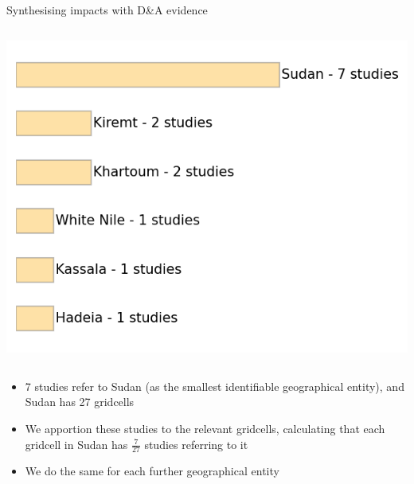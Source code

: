 \documentclass[9pt]{beamer}
\begin{document}
\begin{frame}{Synthesising impacts with D\&A evidence}
\begin{columns}
\begin{column}{0.4\linewidth}
	\includegraphics[width=\linewidth]{../plots/maps/sudan_precipitation_study_places.png}
\end{column}
\end{columns}

\begin{itemize}
\item 7 studies refer to Sudan (as the smallest identifiable geographical entity), and Sudan has 27 gridcells
\item We apportion these studies to the relevant gridcells, calculating that each gridcell in Sudan has $\frac{7}{27}$ studies referring to it
\item We do the same for each further geographical entity
\end{itemize}
\end{frame}
\end{document}

